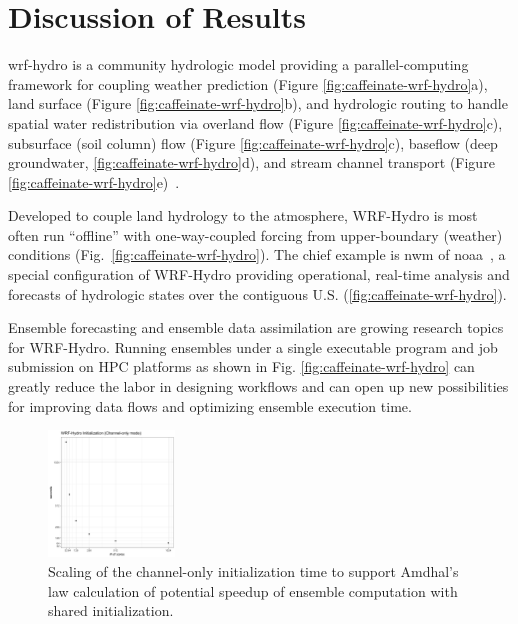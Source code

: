 \section{Discussion of Results}\label{sec:discussion}
\gls{wrf-hydro} is a community hydrologic model providing a parallel-computing
framework for coupling weather prediction (Figure \ref{fig:caffeinate-wrf-hydro}a), land surface
(Figure \ref{fig:caffeinate-wrf-hydro}b), and hydrologic routing to handle spatial water redistribution
via overland flow (Figure \ref{fig:caffeinate-wrf-hydro}c), subsurface (soil column) flow (Figure \ref{fig:caffeinate-wrf-hydro}c),
baseflow (deep groundwater, \ref{fig:caffeinate-wrf-hydro}d), and stream channel transport
(Figure \ref{fig:caffeinate-wrf-hydro}e)~\cite{gochisEtal2014}.

Developed to couple land hydrology to the atmosphere,
WRF-Hydro is most often run ``offline'' with one-way-coupled
forcing from upper-boundary (weather) conditions (Fig.~\ref{fig:caffeinate-wrf-hydro}).
The chief example is \gls{nwm} of \gls{noaa}~\cite{noaa2016}, a  special
configuration of WRF-Hydro providing operational, real-time analysis and forecasts of
hydrologic states over the contiguous U.S. (\ref{fig:caffeinate-wrf-hydro}).

Ensemble forecasting and ensemble data assimilation are
growing research topics for WRF-Hydro. Running ensembles under a
single executable program and job submission on HPC platforms as shown in
Fig. \ref{fig:caffeinate-wrf-hydro} can greatly reduce the
labor in designing workflows and can open up new
possibilities for improving data flows and optimizing ensemble
execution time.

\begin{figure}
\includegraphics[width=0.3\textwidth]{figures/init_timing_linear.png}
\vspace{-7pt}
\caption{Scaling of the channel-only initialization time to
  support Amdhal's law calculation of potential speedup of ensemble
  computation with shared initialization. \label{fig:wrf-hydro-init-scaling}}
\end{figure}

